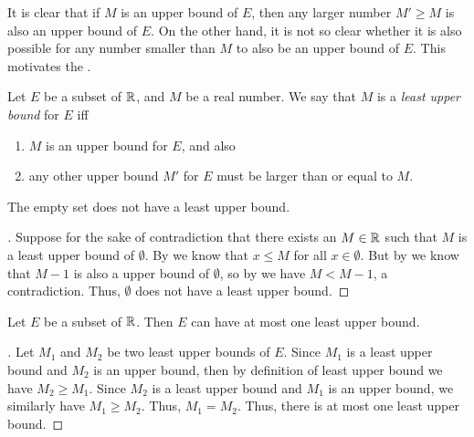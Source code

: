 \begin{note}
  It is clear that if \(M\) is an upper bound of \(E\), then any larger number \(M' \geq M\) is also an upper bound of \(E\).
  On the other hand, it is not so clear whether it is also possible for any number smaller than \(M\) to also be an upper bound of \(E\).
  This motivates the .
\end{note}

\begin{defn}\label{i:5.5.5}
  Let \(E\) be a subset of \(\mathbb{R}\), and \(M\) be a real number.
  We say that \(M\) is a \emph{least upper bound} for \(E\) iff
  \begin{enumerate}
    \item \(M\) is an upper bound for \(E\), and also
    \item any other upper bound \(M'\) for \(E\) must be larger than or equal to \(M\).
  \end{enumerate}
\end{defn}

\setcounter{thm}{6}
\begin{eg}\label{i:5.5.7}
  The empty set does not have a least upper bound.
\end{eg}

\begin{proof}[]
  Suppose for the sake of contradiction that there exists an \(M \in \mathbb{R}\) such that \(M\) is a least upper bound of \(\emptyset\).
  By  we know that \(x \leq M\) for all \(x \in \emptyset\).
  But by  we know that \(M - 1\) is also a upper bound of \(\emptyset\), so by  we have \(M < M - 1\), a contradiction.
  Thus, \(\emptyset\) does not have a least upper bound.
\end{proof}

\begin{prop}\label{i:5.5.8}
  Let \(E\) be a subset of \(\mathbb{R}\).
  Then \(E\) can have at most one least upper bound.
\end{prop}

\begin{proof}[]
  Let \(M_1\) and \(M_2\) be two least upper bounds of \(E\).
  Since \(M_1\) is a least upper bound and \(M_2\) is an upper bound, then by definition of least upper bound we have \(M_2 \geq M_1\).
  Since \(M_2\) is a least upper bound and \(M_1\) is an upper bound, we similarly have \(M_1 \geq M_2\).
  Thus, \(M_1 = M_2\).
  Thus, there is at most one least upper bound.
\end{proof}

